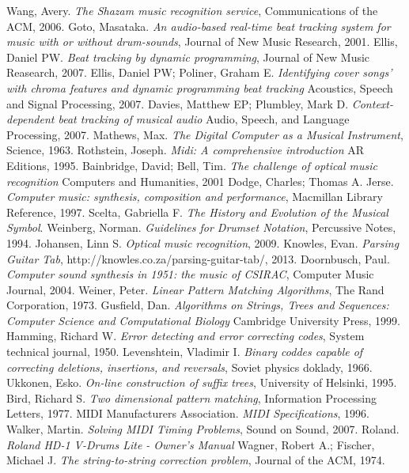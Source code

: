 \documentclass[12pt,twoside,notitlepage]{report}
\begin{document}

\begin{thebibliography}{99}
	Wang, Avery.
	\emph{The Shazam music recognition service},
	Communications of the ACM,
	2006.
	Goto, Masataka.
	\emph{An audio-based real-time beat tracking system for music with or without drum-sounds},
	Journal of New Music Research,
	2001.
	Ellis, Daniel PW.
	\emph{Beat tracking by dynamic programming},
	Journal of New Music Reasearch,
	2007.
	Ellis, Daniel PW; Poliner, Graham E.
	\emph{Identifying cover songs' with chroma features and dynamic programming beat tracking}
	Acoustics, Speech and Signal Processing,
	2007.
	Davies, Matthew EP; Plumbley, Mark D.
	\emph{Context-dependent beat tracking of musical audio}
	Audio, Speech, and Language Processing,
	2007.
	Mathews, Max.
	\emph{The Digital Computer as a Musical Instrument},
	Science,
	1963.
	Rothstein, Joseph.
	\emph{Midi: A comprehensive introduction}
	AR Editions,
	1995.
	Bainbridge, David; Bell, Tim.
	\emph{The challenge of optical music recognition}
	Computers and Humanities,
	2001
	Dodge, Charles; Thomas A. Jerse.
	\emph{Computer music: synthesis, composition and performance},
	Macmillan Library Reference, 
	1997.
	Scelta, Gabriella F.
	\emph{The History and Evolution of the Musical Symbol}.
	Weinberg, Norman.
	\emph{Guidelines for Drumset Notation},
	Percussive Notes,
	1994.
	Johansen, Linn S.
	\emph{Optical music recognition},
	2009.	
	Knowles, Evan.
	\emph{Parsing Guitar Tab},
	http://knowles.co.za/parsing-guitar-tab/,
	2013.
	Doornbusch, Paul.
	\emph{Computer sound synthesis in 1951: the music of CSIRAC},
	Computer Music Journal,
	2004.
	Weiner, Peter.
	\emph{Linear Pattern Matching Algorithms},
	The Rand Corporation,
	1973.
	Gusfield, Dan.
	\emph{Algorithms on Strings, Trees and Sequences: Computer Science and Computational Biology}
	Cambridge University Press,
	1999.
	Hamming, Richard W.
	\emph{Error detecting and error correcting codes},
	System technical journal,
	1950.
	Levenshtein, Vladimir I.
	\emph{Binary coddes capable of correcting deletions, insertions, and reversals},
	Soviet physics doklady,
	1966.
	Ukkonen, Esko.
	\emph{On-line construction of suffix trees},
	University of Helsinki,
	1995.
	Bird, Richard S.
	\emph{Two dimensional pattern matching},
	Information Processing Letters,
	1977.
	MIDI Manufacturers Association.
	\emph{MIDI Specifications},
	1996. 
	Walker, Martin.
	\emph{Solving MIDI Timing Problems},
	Sound on Sound,
	2007.
	Roland.
	\emph{Roland HD-1 V-Drums Lite - Owner's Manual}
	Wagner, Robert A.; Fischer, Michael J.
	\emph{The string-to-string correction problem},
	Journal of the ACM,
	1974.
	


\end{thebibliography}
\cleardoublepage

\appendix
\end{document}
